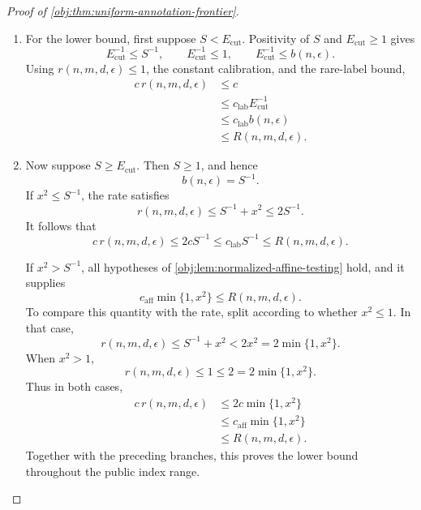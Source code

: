 \begin{proof}[Proof of \cref{obj:thm:uniform-annotation-frontier}]
\begin{enumerate}
The lifted rule \((\mathcal D,U)\mapsto\widehat\tau(\mathcal D,U)\) is Borel measurable by composition with the data projection and takes values in \([-1,1]\). It is therefore admissible in \cref{obj:def:risk}. Squared-error risks are nonnegative, and the defining minimax infimum yields
\[
R(n,m,d,\epsilon)
\le
\sup_{P\in\mathcal M_{d,\epsilon}}
\mathbb E_P[
(\widehat\tau(\mathcal D,U)-\tau(P))^2]
\le C_{\mathrm{up}}r(n,m,d,\epsilon)
\le Cr(n,m,d,\epsilon),
\]
where the last inequality uses \(r(n,m,d,\epsilon)\ge0\).

\item For the lower bound, first suppose \(S<E_{\mathrm{cut}}\). Positivity of \(S\) and \(E_{\mathrm{cut}}\ge1\) gives
\[
E_{\mathrm{cut}}^{-1}\le S^{-1},
\qquad
E_{\mathrm{cut}}^{-1}\le1,
\qquad
E_{\mathrm{cut}}^{-1}
\le b(n,\epsilon).
\]
Using \(r(n,m,d,\epsilon)\le1\), the constant calibration, and the rare-label bound,
\[
\begin{aligned}
c\,r(n,m,d,\epsilon)
&\le c\\
&\le c_{\mathrm{lab}}E_{\mathrm{cut}}^{-1}\\
&\le c_{\mathrm{lab}}b(n,\epsilon)\\
&\le R(n,m,d,\epsilon).
\end{aligned}
\]

\item Now suppose \(S\ge E_{\mathrm{cut}}\). Then \(S\ge1\), and hence
\[
b(n,\epsilon)=S^{-1}.
\]
If \(x^2\le S^{-1}\), the rate satisfies
\[
r(n,m,d,\epsilon)
\le S^{-1}+x^2\le2S^{-1}.
\]
It follows that
\[
c\,r(n,m,d,\epsilon)
\le2cS^{-1}
\le c_{\mathrm{lab}}S^{-1}
\le R(n,m,d,\epsilon).
\]

If \(x^2>S^{-1}\), all hypotheses of \cref{obj:lem:normalized-affine-testing} hold, and it supplies
\[
c_{\mathrm{aff}}\min\{1,x^2\}\le R(n,m,d,\epsilon).
\]
To compare this quantity with the rate, split according to whether \(x^2\le1\). In that case,
\[
r(n,m,d,\epsilon)
\le S^{-1}+x^2
<2x^2
=2\min\{1,x^2\}.
\]
When \(x^2>1\),
\[
r(n,m,d,\epsilon)\le1\le2=2\min\{1,x^2\}.
\]
Thus in both cases,
\[
\begin{aligned}
c\,r(n,m,d,\epsilon)
&\le2c\min\{1,x^2\}\\
&\le c_{\mathrm{aff}}\min\{1,x^2\}\\
&\le R(n,m,d,\epsilon).
\end{aligned}
\]
Together with the preceding branches, this proves the lower bound throughout the public index range.


\end{enumerate}
\end{proof}
